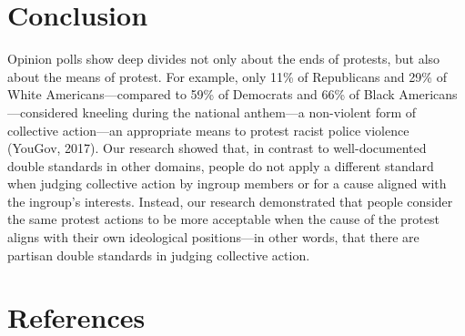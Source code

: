 \documentclass[twocolumn, 11pt, letterpaper]{article}
\newcommand{\refsection}{\section{References}}
\begin{document}
\hypertarget{conclusion}{%
\section{Conclusion}\label{conclusion}}

Opinion polls show deep divides not only about the ends of protests, but
also about the means of protest. For example, only 11\% of Republicans
and 29\% of White Americans---compared to 59\% of Democrats and 66\% of
Black Americans---considered kneeling during the national anthem---a
non-violent form of collective action---an appropriate means to protest
racist police violence (YouGov, 2017). Our research showed that, in
contrast to well-documented double standards in other domains, people do
not apply a different standard when judging collective action by ingroup
members or for a cause aligned with the ingroup's interests. Instead,
our research demonstrated that people consider the same protest actions
to be more acceptable when the cause of the protest aligns with their
own ideological positions---in other words, that there are partisan
double standards in judging collective action.

\refsection

\begingroup

\noindent \setlength{\parindent}{-0.5in} \setlength{\leftskip}{0.5in}
\small
\end{document}
